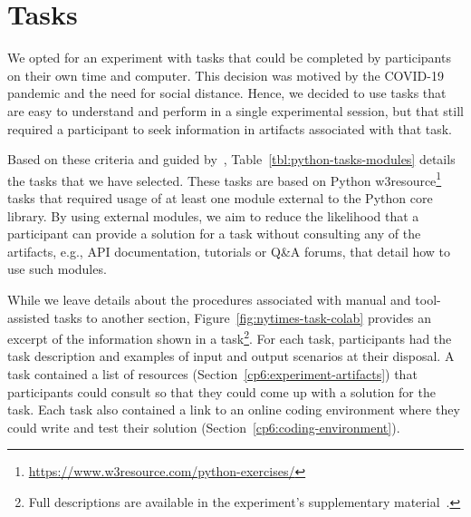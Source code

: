 
\section{Tasks}
\label{cp6:tasks}



We opted for an experiment with tasks that could be completed by participants on their own time and computer.
This decision was motived by the COVID-19 pandemic and the need for social distance\red{~\cite{}}. 
Hence, we decided to use tasks that are easy to understand and perform in a single experimental session, but that still required a participant  
to seek information in artifacts associated with that task.

% 


Based on these criteria and guided by~\cite{thiselton2019},
Table~\ref{tbl:python-tasks-modules} details the tasks that we have selected. 
These tasks are based on 
Python w3resource\footnote{\url{https://www.w3resource.com/python-exercises/}} tasks
that required usage of at least one module external to the Python core library.
By using external modules, we aim to reduce the likelihood that a participant 
can provide a solution for a task without consulting any of the artifacts,
e.g., API documentation, tutorials or Q\&A forums,
that detail how to use such modules. 











While we leave details about the procedures associated with manual and tool-assisted tasks to another section, Figure~\ref{fig:nytimes-task-colab} provides an excerpt of the information shown in a task\footnote{Full descriptions are available in the experiment's supplementary material~\red{\cite{}}.}.
For each task, participants had the task description and examples of input and output scenarios at their disposal. A task contained a list of resources (Section~\ref{cp6:experiment-artifacts}) that participants could consult 
so that they could come up with a solution for the task.
Each task also contained a link to an online coding environment
where they could write and test their solution (Section~\ref{cp6:coding-environment}). 




